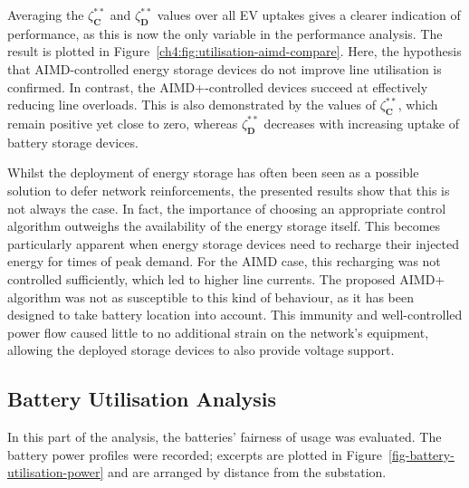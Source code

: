 

Averaging the $\zeta_\textbf{C}^{**}$ and $\zeta_\textbf{D}^{**}$ values over all EV uptakes gives a clearer indication of performance, as this is now the only variable in the performance analysis.
The result is plotted in Figure~\ref{ch4:fig:utilisation-aimd-compare}.
Here, the hypothesis that AIMD-controlled energy storage devices do not improve line utilisation is confirmed.
In contrast, the AIMD+-controlled devices succeed at effectively reducing line overloads. This is also demonstrated by the values of $\zeta_\textbf{C}^{**}$, which remain positive yet close to zero, whereas $\zeta_\textbf{D}^{**}$ decreases with increasing uptake of battery storage devices.

Whilst the deployment of energy storage has often been seen as a possible solution to defer network reinforcements, the presented results show that this is not always the case.
In fact, the importance of choosing an appropriate control algorithm outweighs the availability of the energy storage itself.
This becomes particularly apparent when energy storage devices need to recharge their injected energy for times of peak demand.
For the AIMD case, this recharging was not controlled sufficiently, which led to higher line currents.
The proposed AIMD+ algorithm was not as susceptible to this kind of behaviour, as it has been designed to take battery location into account.
This immunity and well-controlled power flow caused little to no additional strain on the network's equipment, allowing the deployed storage devices to also provide voltage support.

\subsection{Battery Utilisation Analysis}

In this part of the analysis, the batteries' fairness of usage was evaluated. The battery power profiles were recorded; excerpts are plotted in Figure~\ref{fig-battery-utilisation-power} and are arranged by distance from the substation.



